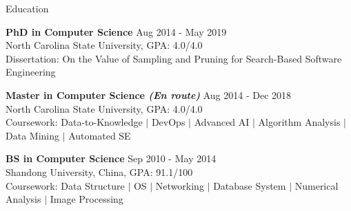 \documentclass{resume} %
\begin{document}

\vspace{2em}

\begin{rSection}{Education}

{\bf PhD in Computer Science} \hfill {Aug 2014 - May 2019}\\ 
North Carolina State University, GPA: 4.0/4.0  \\
Dissertation: On the Value of Sampling and Pruning for Search-Based Software Engineering

{\bf Master in Computer Science {\it (En route)}} \hfill {Aug 2014 - Dec 2018}\\ 
North Carolina State University, GPA: 4.0/4.0  \\
Coursework: Data-to-Knowledge $|$ DevOps $|$ Advanced AI $|$ Algorithm Analysis $|$ Data Mining $|$ Automated SE

{\bf BS in Computer Science} \hfill {Sep 2010 - May 2014}\\ 
Shandong University, China, GPA: 91.1/100  \\
Coursework: Data Structure $|$ OS $|$ Networking $|$ Database System $|$ Numerical Analysis $|$ Image Processing

\end{rSection} 

\end{document}
